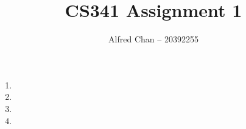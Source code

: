 \documentclass[12pt]{article}
\title{CS341 Assignment 1}
\author{Alfred Chan -- 20392255}
\begin{document}
\maketitle

\begin{enumerate}
\item
\item
\item
\item
\end{enumerate}
\end{document}
